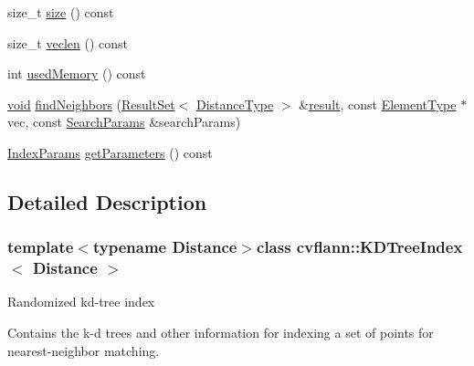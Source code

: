 \begin{DoxyCompactItemize}
size\-\_\-t \hyperlink{classcvflann_1_1KDTreeIndex_a3076b06d255ed13bd3c83066986dc91a}{size} () const 
\item 
size\-\_\-t \hyperlink{classcvflann_1_1KDTreeIndex_a35ff8e5d4050cbbecbe0e878baba06de}{veclen} () const 
\item 
int \hyperlink{classcvflann_1_1KDTreeIndex_a7eae6a18374d94ea8a2f27d1cdefde4d}{used\-Memory} () const 
\item 
\hyperlink{legacy_8hpp_a8bb47f092d473522721002c86c13b94e}{void} \hyperlink{classcvflann_1_1KDTreeIndex_ada91fb72025dec63ac669cfe36a1b66f}{find\-Neighbors} (\hyperlink{classcvflann_1_1ResultSet}{Result\-Set}$<$ \hyperlink{classcvflann_1_1KDTreeIndex_a10ed3a3afa91fed415ab7c2d1b7c4014}{Distance\-Type} $>$ \&\hyperlink{legacy_8hpp_a0bb77d54f6769867cfdf389897bd8e43}{result}, const \hyperlink{classcvflann_1_1KDTreeIndex_a200ee43145794ee028f415f205934d24}{Element\-Type} $\ast$vec, const \hyperlink{structcvflann_1_1SearchParams}{Search\-Params} \&search\-Params)
\item 
\hyperlink{namespacecvflann_a742b4c7076c21012054af74a9ee48289}{Index\-Params} \hyperlink{classcvflann_1_1KDTreeIndex_a3d5ebd1629626618e5f73063343ba3dc}{get\-Parameters} () const 
\end{DoxyCompactItemize}


\subsection{Detailed Description}
\subsubsection*{template$<$typename Distance$>$class cvflann\-::\-K\-D\-Tree\-Index$<$ Distance $>$}

Randomized kd-\/tree index

Contains the k-\/d trees and other information for indexing a set of points for nearest-\/neighbor matching. 

